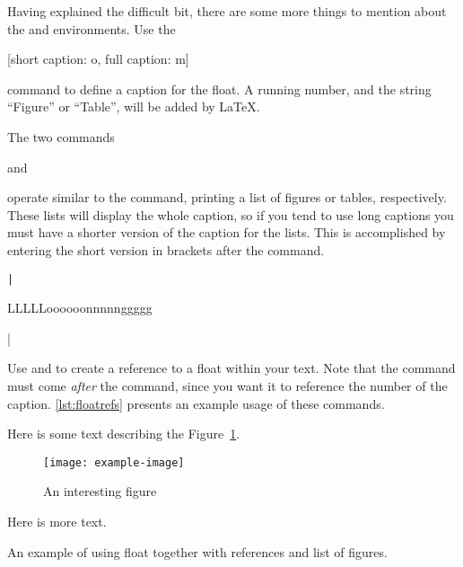 Having explained the difficult bit, there are some more things to mention about
the  and  environments. Use the
\begin{lscommand}
  [short caption: o, full caption: m]
\end{lscommand}
command to define a caption for the float. A running number, and
the string \enquote{Figure} or \enquote{Table}, will be added by \LaTeX.

The two commands
\begin{lscommand}
   and 
\end{lscommand}
operate similar to the  command, printing a list of
figures or tables, respectively.  These lists will display the whole caption,
so if you tend to use long captions you must have a shorter version of the
caption for the lists. This is accomplished by entering the short version in
brackets after the  command.
\begin{code}
\texttt|\caption[Short]{LLLLLoooooonnnnnggggg}|
\end{code}

Use  and  to create a reference to a float within
your text. Note that the  command must come \emph{after} the
 command, since you want it to reference the number of the
caption. \autoref{lst:floatrefs} presents an example usage of these
commands.
\begin{listing}
  \begin{lined}{11cm}
    \begin{example}[standalone, paperheight=4.5cm, to_page=2, vertical_pages]
\usepackage{graphicx} %
\geometry{includefoot} %
\listoffigures
\vspace{.3cm}%

Here is some text describing
the Figure~\ref{figure}.

\begin{figure}
  \centering
  \texttt{[image: example-image]}
  \caption[A figure]{An
    interesting figure}%
  \label{figure}
\end{figure}

Here is more text.
\end{example}
  \end{lined}
  \caption{An example of using  float together with references and
    list of figures.}\label{lst:floatrefs}
\end{listing}

